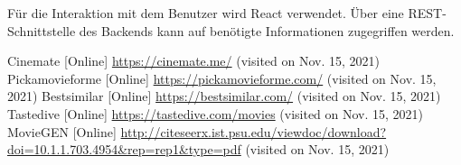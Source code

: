 \documentclass[conference]{IEEEtran}
\begin{document}
Für die Interaktion mit dem Benutzer wird React verwendet. Über eine REST-Schnittstelle des Backends kann auf benötigte Informationen zugegriffen werden.


\begin{thebibliography}{0}
        Cinemate [Online] \url{https://cinemate.me/} (visited on Nov. 15, 2021)
        Pickamovieforme [Online] \url{https://pickamovieforme.com/} (visited on Nov. 15, 2021)
        Bestsimilar [Online] \url{https://bestsimilar.com/} (visited on Nov. 15, 2021)
        Tastedive [Online] \url{https://tastedive.com/movies} (visited on Nov. 15, 2021)
        MovieGEN [Online] \url{http://citeseerx.ist.psu.edu/viewdoc/download?doi=10.1.1.703.4954\&rep=rep1\&type=pdf} (visited on Nov. 15, 2021)
\end{thebibliography}
\vspace{12pt}
\end{document}
